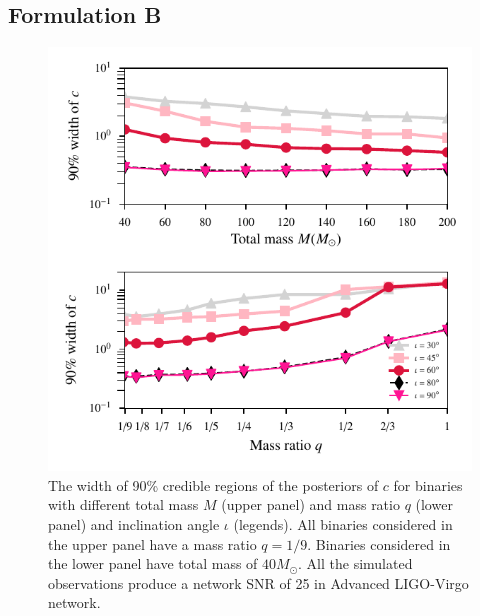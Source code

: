 \documentclass[prd,preprintnumbers,twocolumn,eqsecnum,floatfix,a4paper,nofootinbib,superscriptaddress]{revtex4}
\begin{document}
\subsection{Formulation B}
\label{sec:formulationB}

\begin{figure}[h]
	\begin{center}
		\includegraphics[scale=0.85]{figs/90_percent_CI_c1.pdf}
	\end{center} 
	\caption{The width of 90\% credible regions of the posteriors of $c$ for binaries with different total mass $M$ (upper panel) and mass ratio $q$ (lower panel) and inclination angle $\iota$ (legends). All binaries considered in the upper panel have a mass ratio $q=1/9$. Binaries considered in the lower panel have total mass of $40M_{\odot}$. All the simulated observations produce a network SNR of 25 in Advanced LIGO-Virgo network.}
	\label{fig:constraint_c}
\end{figure}
 
\end{document}

